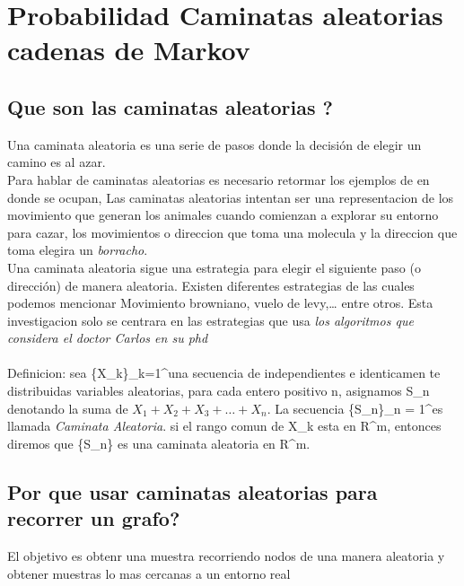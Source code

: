 \chapter{Probabilidad Caminatas aleatorias   cadenas de Markov} %
\label{Chapter1}


\section {Que son las caminatas aleatorias ?}
Una caminata aleatoria es una serie de pasos donde la decisi\'on de elegir un
camino es al azar.\\
Para hablar de caminatas aleatorias es necesario retormar los ejemplos de en donde se ocupan,
Las caminatas aleatorias intentan ser una representacion de los movimiento que
generan los animales cuando comienzan a explorar su entorno para cazar, los
movimientos o direccion que toma una molecula y la direccion que toma elegira un
\emph{borracho}.\\

Una caminata aleatoria sigue una  estrategia para elegir el siguiente paso (o
direcci\'on)  de manera aleatoria. Existen diferentes estrategias de las cuales podemos mencionar
Movimiento browniano, vuelo de levy,\ldots  {} entre otros. Esta
investigacion solo se centrara en las estrategias que usa \emph{los algoritmos
  que considera el doctor Carlos en su phd } \\






\\
Definicion: sea \{X_k\}_{k=1}^\inf una secuencia de independientes e identicamen
te distribuidas variables aleatorias, para cada entero positivo n, asignamos
S_n denotando la suma de $X_1 + X_2 + X_3 + \ldots + X_n  $. La secuencia
\{S_n\}_{n = 1}^\inf es llamada \emph{Caminata Aleatoria}. si el rango comun de
X_k esta en R^m, entonces diremos que \{S_n\} es una caminata aleatoria en R^m.

\section{Por que  usar caminatas aleatorias para recorrer un grafo?}
El objetivo es  obtenr una muestra recorriendo nodos de una manera aleatoria
y obtener muestras lo mas cercanas a un entorno real
